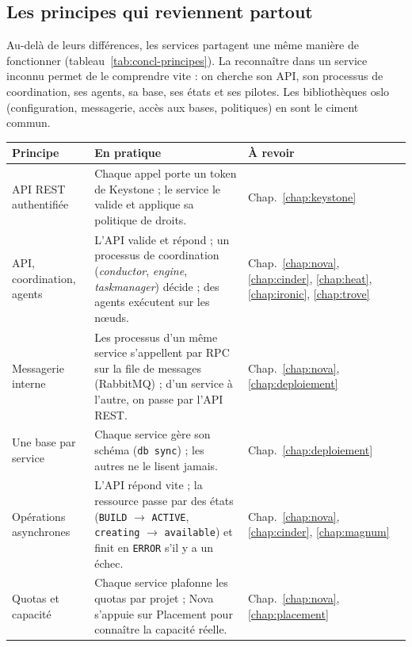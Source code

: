 \subsection*{Les principes qui reviennent partout}

Au-delà de leurs différences, les services partagent une même manière de fonctionner (tableau~\ref{tab:concl-principes}). La
reconnaître dans un service inconnu permet de le comprendre vite : on cherche son API, son processus de coordination, ses agents,
sa base, ses états et ses pilotes. Les bibliothèques \gls{oslo} (configuration, messagerie, accès aux bases, politiques) en sont
le ciment commun.

\begin{table}[!ht]
\centering
\renewcommand{\arraystretch}{1.25}
\small
\begin{tabular}{@{}>{\raggedright\arraybackslash}p{3.2cm}>{\raggedright\arraybackslash}p{9.0cm}>{\raggedright\arraybackslash}p{3.1cm}@{}}
\toprule
\textbf{Principe} & \textbf{En pratique} & \textbf{À revoir} \\
\midrule
API REST authentifiée & Chaque appel porte un token de Keystone ; le service le valide et applique sa politique de droits. & Chap.~\ref{chap:keystone} \\
API, coordination, agents & L'API valide et répond ; un processus de coordination (\emph{conductor}, \emph{engine}, \emph{taskmanager}) décide ; des agents exécutent sur les nœuds. & Chap.~\ref{chap:nova}, \ref{chap:cinder}, \ref{chap:heat}, \ref{chap:ironic}, \ref{chap:trove} \\
Messagerie interne & Les processus d'un même service s'appellent par RPC sur la file de messages (RabbitMQ) ; d'un service à l'autre, on passe par l'API REST. & Chap.~\ref{chap:nova}, \ref{chap:deploiement} \\
Une base par service & Chaque service gère son schéma (\texttt{db sync}) ; les autres ne le lisent jamais. & Chap.~\ref{chap:deploiement} \\
Opérations asynchrones & L'API répond vite ; la ressource passe par des états (\texttt{BUILD} $\to$ \texttt{ACTIVE}, \texttt{creating} $\to$ \texttt{available}) et finit en \texttt{ERROR} s'il y a un échec. & Chap.~\ref{chap:nova}, \ref{chap:cinder}, \ref{chap:magnum} \\
Quotas et capacité & Chaque service plafonne les \glspl{quota} par projet ; Nova s'appuie sur Placement pour connaître la capacité réelle. & Chap.~\ref{chap:nova}, \ref{chap:placement} \\

\end{tabular}
\end{table}
